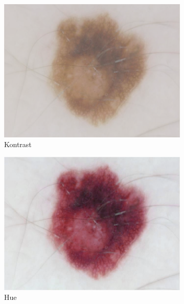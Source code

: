 \begin{figure}[t!]
\begin{subfigure}{0.24\linewidth}
		\includegraphics[width=\textwidth]{./pics/augmentations/contrast.png}
		\caption{Kontrast}
		\label{subfig:aug_contrast}
	\end{subfigure}
	\begin{subfigure}{0.24\linewidth}
		\includegraphics[width=\textwidth]{./pics/augmentations/hue.png}
		\caption{Hue}
		\label{subfig:aug_hue}
	\end{subfigure}
	\begin{subfigure}{0.24\linewidth}

\end{subfigure}
\end{figure}
